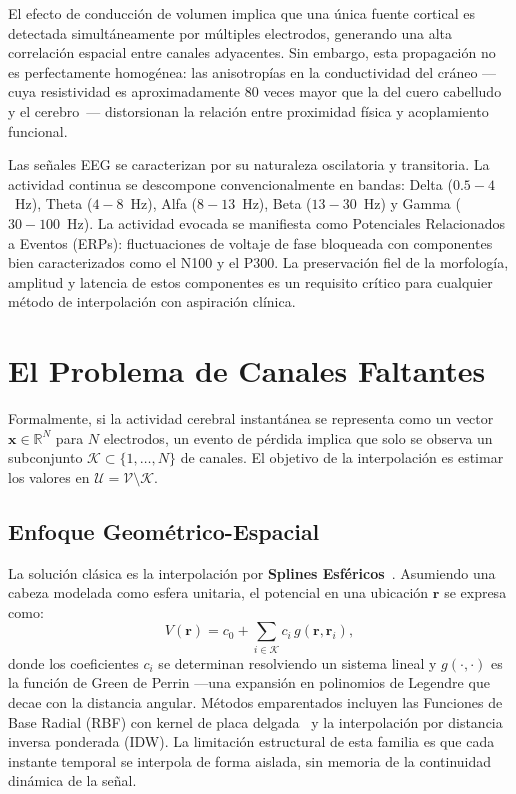 El efecto de conducción de volumen implica que una única fuente cortical es detectada simultáneamente por múltiples electrodos, generando una alta correlación espacial entre canales adyacentes. Sin embargo, esta propagación no es perfectamente homogénea: las anisotropías en la conductividad del cráneo —cuya resistividad es aproximadamente 80 veces mayor que la del cuero cabelludo y el cerebro~\cite{lai2005estimation}— distorsionan la relación entre proximidad física y acoplamiento funcional.

Las señales EEG se caracterizan por su naturaleza oscilatoria y transitoria. La actividad continua se descompone convencionalmente en bandas: Delta ($0.5{-}4$~Hz), Theta ($4{-}8$~Hz), Alfa ($8{-}13$~Hz), Beta ($13{-}30$~Hz) y Gamma ($30{-}100$~Hz). La actividad evocada se manifiesta como Potenciales Relacionados a Eventos (ERPs): fluctuaciones de voltaje de fase bloqueada con componentes bien caracterizados como el N100 y el P300. La preservación fiel de la morfología, amplitud y latencia de estos componentes es un requisito crítico para cualquier método de interpolación con aspiración clínica.

\section{El Problema de Canales Faltantes}

Formalmente, si la actividad cerebral instantánea se representa como un vector $\mathbf{x} \in \mathbb{R}^N$ para $N$ electrodos, un evento de pérdida implica que solo se observa un subconjunto $\mathcal{K} \subset \{1, \dots, N\}$ de canales. El objetivo de la interpolación es estimar los valores en $\mathcal{U} = \mathcal{V} \setminus \mathcal{K}$.

\subsection{Enfoque Geométrico-Espacial}

La solución clásica es la interpolación por \textbf{Splines Esféricos}~\cite{perrin1989}. Asumiendo una cabeza modelada como esfera unitaria, el potencial en una ubicación $\mathbf{r}$ se expresa como:
\begin{equation}
    V(\mathbf{r}) = c_0 + \sum_{i \in \mathcal{K}} c_i \, g(\mathbf{r}, \mathbf{r}_i),
    \label{eq:spline_basis}
\end{equation}
donde los coeficientes $c_i$ se determinan resolviendo un sistema lineal y $g(\cdot, \cdot)$ es la función de Green de Perrin —una expansión en polinomios de Legendre que decae con la distancia angular. Métodos emparentados incluyen las Funciones de Base Radial (RBF) con kernel de placa delgada~\cite{jager_reconstruction_2016} y la interpolación por distancia inversa ponderada (IDW). La limitación estructural de esta familia es que cada instante temporal se interpola de forma aislada, sin memoria de la continuidad dinámica de la señal.

